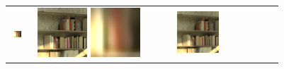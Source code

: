 \begin{figure}[ht!]
{\begin{tabular}{cccccc}
\begin{minipage}{0.180\textwidth}
            \includegraphics[width=0.46\textwidth, height=0.46\textwidth,cfbox=red 1pt 0pt]{img/qual/Bicycle/DistgSSR/SR.LAM.png}
        \end{minipage} &
        \begin{minipage}{0.180\textwidth}
            \centering
            \includegraphics[width=0.46\textwidth, height=0.46\textwidth,cfbox=blue 1pt 0pt]{img/qual/Bicycle/LFT/SR.png}
            \includegraphics[width=0.46\textwidth, height=0.46\textwidth,cfbox=red 1pt 0pt]{img/qual/Bicycle/LFT/SR.LAM.png}
        \end{minipage} &
        \begin{minipage}{0.180\textwidth}
            \centering
            \includegraphics[width=0.46\textwidth, height=0.46\textwidth,cfbox=blue 1pt 0pt]{img/qual/Bicycle/EPIT/SR.png}

\end{minipage}
\end{tabular}}
\end{figure}
